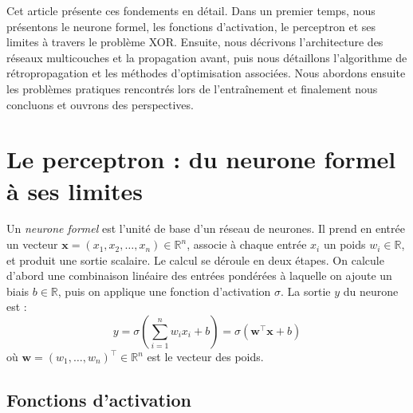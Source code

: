\documentclass[a4paper,french]{style-LaTeX}
\begin{document}
Cet article présente ces fondements en détail. Dans un premier temps, nous présentons le neurone formel, les fonctions d'activation, le perceptron et ses limites à travers le problème XOR. Ensuite, nous décrivons l'architecture des réseaux multicouches et la propagation avant, puis nous détaillons l'algorithme de rétropropagation et les méthodes d'optimisation associées. Nous abordons ensuite les problèmes pratiques rencontrés lors de l'entraînement et finalement nous concluons et ouvrons des perspectives.

\section{Le perceptron : du neurone formel à ses limites}

Un \emph{neurone formel} est l'unité de base d'un réseau de neurones. Il prend en entrée un vecteur $\mathbf{x} = (x_1, x_2, \ldots, x_n) \in \mathbb{R}^n$, associe à chaque entrée $x_i$ un poids $w_i \in \mathbb{R}$, et produit une sortie scalaire. Le calcul se déroule en deux étapes. On calcule d'abord une combinaison linéaire des entrées pondérées à laquelle on ajoute un biais $b \in \mathbb{R}$, puis on applique une fonction d'activation $\sigma$. La sortie $y$ du neurone est :
\begin{equation*}
    y = \sigma\!\left(\sum_{i=1}^{n} w_i x_i + b\right) = \sigma(\mathbf{w}^\top \mathbf{x} + b)
\end{equation*}
où $\mathbf{w} = (w_1, \ldots, w_n)^\top \in \mathbb{R}^n$ est le vecteur des poids.

\subsection*{Fonctions d'activation}
\end{document}
